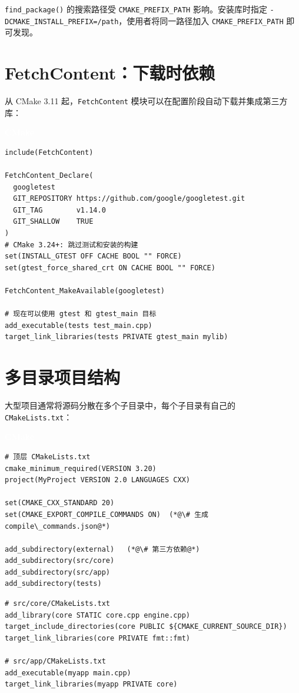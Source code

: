 \documentclass[12pt,a4paper,fontset=fandol]{ctexbook}
\newcommand{\Fn}[1]{\texttt{#1()}}
\newcommand{\Tp}[1]{\texttt{#1}}
\newcommand{\cmakelabel}{%
  \noindent\begin{tcolorbox}[sharp corners,colback=cmakeheadbg,colframe=cmakeheadbg,
    left=6pt,right=6pt,top=2pt,bottom=2pt,boxrule=0pt]
  \textcolor{white}{\small\bfseries\sffamily CMake}\end{tcolorbox}%
}
\begin{document}
\begin{note}
\Fn{find\_\allowbreak{}package} 的搜索路径受 \Tp{CMAKE\_\allowbreak{}PREFIX\_\allowbreak{}PATH} 影响。安装库时指定 \Tp{-DCMAKE\_\allowbreak{}INSTALL\_\allowbreak{}PREFIX=/path}，使用者将同一路径加入 \Tp{CMAKE\_\allowbreak{}PREFIX\_\allowbreak{}PATH} 即可发现。
\end{note}

\section{FetchContent：下载时依赖}

从 CMake 3.11 起，\Tp{FetchContent} 模块可以在配置阶段自动下载并集成第三方库：

\cmakelabel
\begin{lstlisting}[style=cmakestyle]
include(FetchContent)

FetchContent_Declare(
  googletest
  GIT_REPOSITORY https://github.com/google/googletest.git
  GIT_TAG        v1.14.0
  GIT_SHALLOW    TRUE
)
# CMake 3.24+: 跳过测试和安装的构建
set(INSTALL_GTEST OFF CACHE BOOL "" FORCE)
set(gtest_force_shared_crt ON CACHE BOOL "" FORCE)

FetchContent_MakeAvailable(googletest)

# 现在可以使用 gtest 和 gtest_main 目标
add_executable(tests test_main.cpp)
target_link_libraries(tests PRIVATE gtest_main mylib)
\end{lstlisting}

\section{多目录项目结构}

大型项目通常将源码分散在多个子目录中，每个子目录有自己的 \Tp{CMakeLists.txt}：

\cmakelabel
\begin{lstlisting}[style=cmakestyle]
# 顶层 CMakeLists.txt
cmake_minimum_required(VERSION 3.20)
project(MyProject VERSION 2.0 LANGUAGES CXX)

set(CMAKE_CXX_STANDARD 20)
set(CMAKE_EXPORT_COMPILE_COMMANDS ON)  (*@\# 生成 compile\_commands.json@*)

add_subdirectory(external)   (*@\# 第三方依赖@*)
add_subdirectory(src/core)
add_subdirectory(src/app)
add_subdirectory(tests)
\end{lstlisting}

\begin{lstlisting}[style=cmakestyle]
# src/core/CMakeLists.txt
add_library(core STATIC core.cpp engine.cpp)
target_include_directories(core PUBLIC ${CMAKE_CURRENT_SOURCE_DIR})
target_link_libraries(core PRIVATE fmt::fmt)

# src/app/CMakeLists.txt
add_executable(myapp main.cpp)
target_link_libraries(myapp PRIVATE core)
\end{lstlisting}
\end{document}

